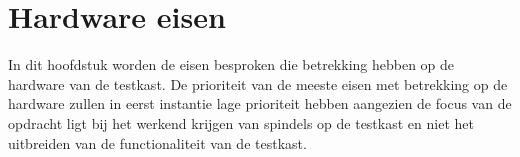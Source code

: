 \section{Hardware eisen}

In dit hoofdstuk worden de eisen besproken die betrekking hebben op de hardware van de testkast. De prioriteit van de meeste eisen met betrekking op de hardware zullen in eerst instantie lage prioriteit hebben aangezien de focus van de opdracht ligt bij het werkend krijgen van spindels op de testkast en niet het uitbreiden van de functionaliteit van de testkast.




